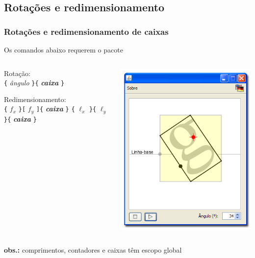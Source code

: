 \documentclass[handout,10pt]{beamer}
\begin{document}
\subsection{Rotações e redimensionamento}
\begin{frame}[fragile]
	\frametitle{Rotações e redimensionamento de caixas}

	\centering

	Os comandos abaixo requerem o pacote 

	\vfill

	\begin{columns}
		\begin{atividade}{8}
			Rotação:\\
			\verb|{|%
				\textit{ângulo}%
			\verb|}{|%
				\textit{\textbf{caixa}}%
			\verb|}|
			
			\bigskip
		
			Redimensionamento:\\		
			\verb|{|%
				$f_x$%
			\verb|}[|%
				$f_y$%
			\verb|]{|%
				\textit{\textbf{caixa}}%
			\verb|}|		
			\verb|{|%
				$\ell_x$%
			\verb|}{|%
				$\ell_y$%
			\verb|}{|%
				\textit{\textbf{caixa}}%
			\verb|}|
		\end{atividade}
		
		\includegraphics[width=\textwidth]{TeXbox_rotation}
	\end{columns}

	\vfill 

	\textbf{obs.:} comprimentos, contadores e caixas têm escopo global

\end{frame}
\end{document}
